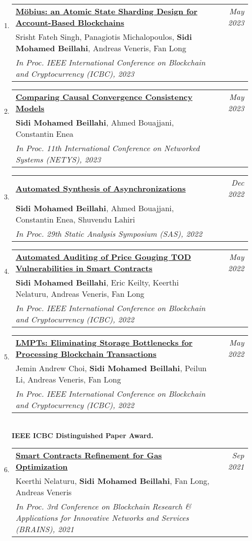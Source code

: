 \documentclass[10pt]{article}
\makeatletter
\newcommand{\lbar}[1]{{\color{#1}\ding{118}}\hspace*{2pt}}
\newenvironment{benumerate}[2]{
    \let\oldItem\item
    \def\item{\addtocounter{enumi}{-2}\oldItem}
    \begin{enumerate}[#2] \itemsep3pt
    \setcounter{enumi}{#1}
    \addtocounter{enumi}{1}}
  {\end{enumerate}}
\newenvironment{publication}[5]
{ \item
  \begin{tabular*}{7.5in}{p{6.3in}@{\extracolsep{\fill}}r}
    \href{#1}{\textbf{#2}} & \textit{#3}\\ #4 &\\ \textit{#5}&\\
  \end{tabular*}
} {}
\newenvironment{region}[3]{%
  \vspace*{0.5ex}
  {\scalebox{1.4}{\textbf{#1}}}
  \begin{benumerate}{#3}{\color{RoyalBlue}#2}}
  {\end{benumerate}\vspace{0.8ex}}
\makeatother
\begin{document}
\begin{region} {\lbar{black}Conference Publications}{{C}1}{17}
  \begin{publication} {https://beillahi.github.io/papers/ICBC23.pdf}
		{Möbius: an Atomic State Sharding Design for Account-Based Blockchains} 
		{May 2023} {Srisht Fateh Singh, Panagiotis Michalopoulos, \textbf{Sidi Mohamed Beillahi}, Andreas Veneris, Fan Long}
		{In Proc. IEEE International Conference on Blockchain and Cryptocurrency (ICBC), 2023}
  \end{publication}

  \begin{publication} {https://beillahi.github.io/papers/NETYS23.pdf}
		{Comparing Causal Convergence Consistency Models}
		{May 2023} {\textbf{Sidi Mohamed Beillahi}, Ahmed Bouajjani, Constantin Enea}
		{In Proc. 11th International Conference on Networked Systems (NETYS), 2023}
  \end{publication}

  \begin{publication} {https://beillahi.github.io/papers/SAS22.pdf}
		{Automated Synthesis of Asynchronizations}
		{Dec 2022} {\textbf{Sidi Mohamed Beillahi}, Ahmed Bouajjani, Constantin Enea, Shuvendu Lahiri}
		{In Proc. 29th Static Analysis Symposium (SAS), 2022}
  \end{publication}

  \begin{publication} {https://beillahi.github.io/papers/2022040426.pdf}
		{Automated Auditing of Price Gouging TOD Vulnerabilities in Smart Contracts}
		{May 2022} {\textbf{Sidi Mohamed Beillahi}, Eric Keilty, Keerthi Nelaturu, Andreas Veneris, Fan Long}
		{In Proc. IEEE International Conference on Blockchain and Cryptocurrency (ICBC), 2022}
  \end{publication}

  \begin{publication} {https://beillahi.github.io/papers/2022044041.pdf}
		{LMPTs: Eliminating Storage Bottlenecks for Processing Blockchain Transactions}
		{May 2022} {Jemin Andrew Choi, \textbf{Sidi Mohamed Beillahi}, Peilun Li, Andreas Veneris, Fan Long}
		{In Proc. IEEE International Conference on Blockchain and Cryptocurrency (ICBC), 2022}
    {\\ \textbf{IEEE ICBC Distinguished Paper Award.}}
  \end{publication}

  \begin{publication} {https://beillahi.github.io/papers/BRAINS21.pdf}
		{Smart Contracts Refinement for Gas Optimization}
		{Sep 2021} {Keerthi Nelaturu, \textbf{Sidi Mohamed Beillahi}, Fan Long, Andreas Veneris}
		{In Proc. 3rd Conference on Blockchain Research \& Applications for Innovative Networks and Services (BRAINS), 2021}
  \end{publication}


\end{region}
\end{document}
